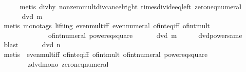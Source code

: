\begin{isabellebody}
\ \ \ \ \isamarkupfalse%
\ {\isacharparenleft}{\kern0pt}metis\ div{\isacharunderscore}{\kern0pt}by{\isacharunderscore}{\kern0pt}{}\ nonzero{\isacharunderscore}{\kern0pt}mult{\isacharunderscore}{\kern0pt}div{\isacharunderscore}{\kern0pt}cancel{\isacharunderscore}{\kern0pt}right\ times{\isacharunderscore}{\kern0pt}divide{\isacharunderscore}{\kern0pt}eq{\isacharunderscore}{\kern0pt}left\ zero{\isacharunderscore}{\kern0pt}neq{\isacharunderscore}{\kern0pt}numeral{\isacharparenright}{\kern0pt}\isanewline
\ \ \isamarkupfalse%
\ \isamarkupfalse%
\ {\isachardoublequoteopen}{}\ dvd\ m{\isachardoublequoteclose}\isanewline
\ \ \ \ \isamarkupfalse%
\ {\isacharparenleft}{\kern0pt}metis\ {\isacharparenleft}{\kern0pt}mono{\isacharunderscore}{\kern0pt}tags{\isacharcomma}{\kern0pt}\ lifting{\isacharparenright}{\kern0pt}\ even{\isacharunderscore}{\kern0pt}mult{\isacharunderscore}{\kern0pt}iff\ even{\isacharunderscore}{\kern0pt}numeral\ of{\isacharunderscore}{\kern0pt}int{\isacharunderscore}{\kern0pt}eq{\isacharunderscore}{\kern0pt}iff\ of{\isacharunderscore}{\kern0pt}int{\isacharunderscore}{\kern0pt}mult\ \isanewline
\ \ \ \ \ \ \ \ \ \ \ \ \ \ of{\isacharunderscore}{\kern0pt}int{\isacharunderscore}{\kern0pt}numeral\ power{}{\isacharunderscore}{\kern0pt}eq{\isacharunderscore}{\kern0pt}square{\isacharparenright}{\kern0pt}\isanewline
\ \ \isamarkupfalse%
\ \isamarkupfalse%
\ {\isachardoublequoteopen}{}\ dvd\ m\isanewline
\ \ \ \ \isamarkupfalse%
\ dvd{\isacharunderscore}{\kern0pt}power{\isacharunderscore}{\kern0pt}same\ \isamarkupfalse%
\ blast\isanewline
\ \ \isamarkupfalse%
\ \isamarkupfalse%
\ {\isachardoublequoteopen}{}\ dvd\ n{\isachardoublequoteclose}\isanewline
\ \ \ \ \isamarkupfalse%
\ {\isacharparenleft}{\kern0pt}metis\ {\isachardoublequoteopen}{}{\isachardoublequoteclose}\ even{\isacharunderscore}{\kern0pt}mult{\isacharunderscore}{\kern0pt}iff\ of{\isacharunderscore}{\kern0pt}int{\isacharunderscore}{\kern0pt}eq{\isacharunderscore}{\kern0pt}iff\ of{\isacharunderscore}{\kern0pt}int{\isacharunderscore}{\kern0pt}mult\ of{\isacharunderscore}{\kern0pt}int{\isacharunderscore}{\kern0pt}numeral\ power{}{\isacharunderscore}{\kern0pt}eq{\isacharunderscore}{\kern0pt}square\isanewline
\ \ \ \ \ \ \ \ zdvd{\isacharunderscore}{\kern0pt}mono\ zero{\isacharunderscore}{\kern0pt}neq{\isacharunderscore}{\kern0pt}numeral{\isacharparenright}{\kern0pt}\isanewline

\end{isabellebody}

